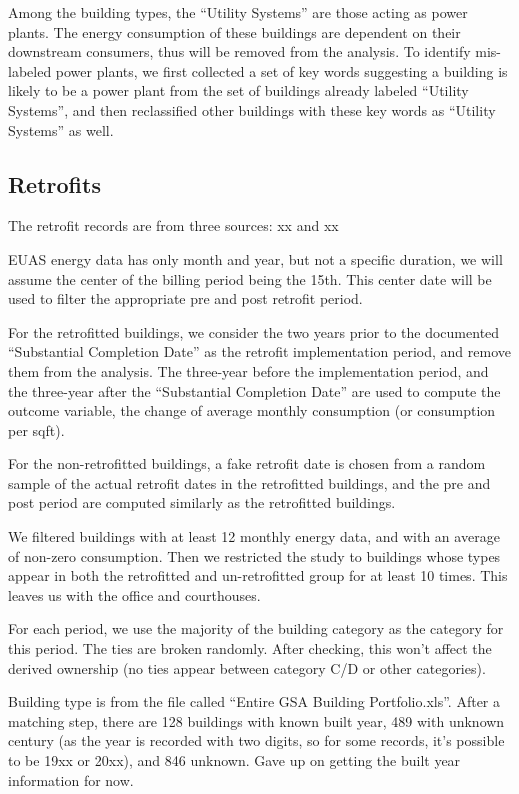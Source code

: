 \documentclass[12pt]{article}
\begin{document}
Among the building types, the ``Utility Systems'' are those acting as power
plants. The energy consumption of these buildings are dependent on their
downstream consumers, thus will be removed from the analysis. To identify
mis-labeled power plants, we first collected a set of key words suggesting a
building is likely to be a power plant from the set of buildings already labeled
``Utility Systems'', and then reclassified other buildings with these key words
as ``Utility Systems'' as well.

\subsection{Retrofits}
The retrofit records are from three sources: xx and xx

EUAS energy data has only month and year, but not a specific duration, we will
assume the center of the billing period being the 15th. This center date will be
used to filter the appropriate pre and post retrofit period.

For the retrofitted buildings, we consider the two years prior to the
documented ``Substantial Completion Date'' as the retrofit implementation
period, and remove them from the analysis. The three-year before the
implementation period, and the three-year after the ``Substantial Completion
Date'' are used to compute the outcome variable, the change of average monthly
consumption (or consumption per sqft).

For the non-retrofitted buildings, a fake retrofit date is chosen from a random
sample of the actual retrofit dates in the retrofitted buildings, and the pre
and post period are computed similarly as the retrofitted buildings.

We filtered buildings with at least 12 monthly energy data, and with an average
of non-zero consumption. Then we restricted the study to buildings whose types
appear in both the retrofitted and un-retrofitted group for at least 10 times.
This leaves us with the office and courthouses.

For each period, we use the majority of the building category as the category
for this period. The ties are broken randomly. After checking, this won't affect
the derived ownership (no ties appear between category C/D or other categories).

Building type is from the file called ``Entire GSA Building Portfolio.xls''.
After a matching step, there are 128 buildings with known built year, 489 with
unknown century (as the year is recorded with two digits, so for some records,
it's possible to be 19xx or 20xx), and 846 unknown. Gave up on getting the built
year information for now.
\end{document}
